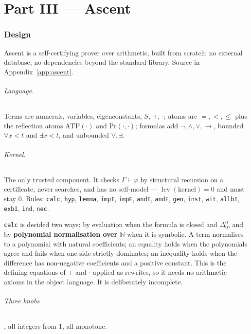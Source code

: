 \documentclass[11pt,a4paper]{article}
\newcommand{\Del}[2]{\Delta^{#1}_{#2}}
\newcommand{\lev}{\operatorname{lev}}
\newcommand{\ATP}{\mathrm{ATP}}
\renewcommand{\Pr}{\mathrm{Pr}}
\begin{document}
\part*{Part III --- Ascent}

\section{Design}

Ascent is a self-certifying prover over arithmetic, built from scratch: no
external database, no dependencies beyond the standard library. Source in
Appendix~\ref{app:ascent}.

\paragraph{Language.} Terms are numerals, variables, eigenconstants, $S$, $+$,
$\cdot$; atoms are $=, <, \le$ plus the reflection atoms $\ATP(\cdot)$ and
$\Pr(\cdot,\cdot)$; formulas add $\lnot, \wedge, \vee, \to$, bounded
$\forall x{<}t$ and $\exists x{<}t$, and unbounded $\forall, \exists$.

\paragraph{Kernel.} The only trusted component. It checks $\Gamma \vdash \varphi$
by structural recursion on a certificate, never searches, and has no self-model
--- $\lev(\text{kernel}) = 0$ and must stay $0$. Rules: \texttt{calc},
\texttt{hyp}, \texttt{lemma}, \texttt{impI}, \texttt{impE}, \texttt{andI},
\texttt{andE}, \texttt{gen}, \texttt{inst}, \texttt{wit}, \texttt{allbI},
\texttt{exbI}, \texttt{ind}, \texttt{nec}.

\texttt{calc} is decided two ways: by evaluation when the formula is closed and
$\Del{0}{0}$, and by \textbf{polynomial normalisation over $\mathbb{N}$} when it
is symbolic. A term normalises to a polynomial with natural coefficients; an
equality holds when the polynomials agree and fails when one side strictly
dominates; an inequality holds when the difference has non-negative
coefficients and a positive constant. This is the defining equations of $+$ and
$\cdot$ applied as rewrites, so it needs no arithmetic axioms in the object
language. It is deliberately incomplete.

\paragraph{Three knobs}, all integers from 1, all monotone.
\end{document}
